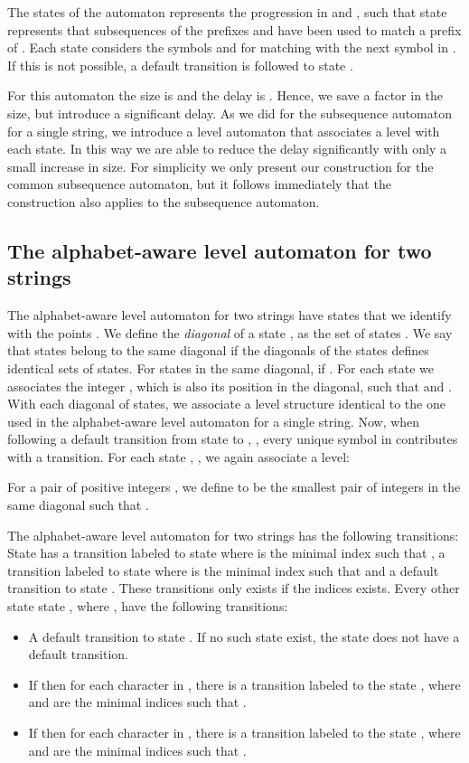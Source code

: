 \documentclass[a4paper,11pt]{article}
\begin{document}
The states of the automaton represents the progression in  and , such that state  represents that subsequences of the prefixes  and  have been used to match a prefix of . Each state  considers the symbols  and  for matching with the next symbol in . If this is not possible, a default transition is followed to state .

For this automaton the size is  and the delay is . Hence, we save a  factor in the size, but introduce a significant delay. As we did for the subsequence automaton for a single string, we introduce a level automaton that associates a level with each state. In this way we are able to reduce the delay significantly with only a small increase in size. For simplicity we only present our construction for the common subsequence automaton, but it follows immediately that the construction also applies to the subsequence automaton.

\subsection{The alphabet-aware level automaton for two strings}
The alphabet-aware level automaton for two strings  have  states that we identify with the points . We define the \emph{diagonal} of a state , as the set of states . We say that states belong to the same diagonal if the diagonals of the states defines identical sets of states. For states  in the same diagonal,  if . For each state  we associates the integer , which is also its position in the diagonal, such that  and . With each diagonal of states, we associate a level structure identical to the one used in the alphabet-aware level automaton for a single string.  Now, when following a default transition from state  to , , every unique symbol in  contributes with a transition.
For each state , , we again associate a level:




For a pair of positive integers , we define  to be the smallest pair of integers in the same diagonal such that .

The alphabet-aware level automaton for two strings  has the following transitions: State  has a transition labeled  to state  where  is the minimal index such that , a transition labeled  to state  where  is the minimal index such that  and a default transition to state .  These transitions only exists if the indices exists. Every other state state , where , have the following transitions:
\begin{itemize}
\item A default transition to state . If no such state exist, the state  does not have a default transition.
\item If  then for each character  in , there is a transition labeled  to the state , where  and  are the minimal indices such that .
\item If  then for each character  in , there is a transition labeled  to the state , where  and  are the minimal indices such that .
\end{itemize}
\end{document}
